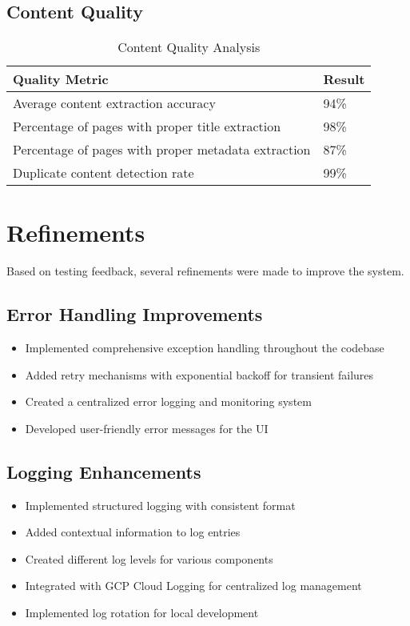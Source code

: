 \documentclass[12pt,a4paper]{report}
\begin{document}
\subsection{Content Quality}
\begin{table}[H]
    \centering
    \begin{tabularx}{\textwidth}{|X|X|}
        \hline
        \textbf{Quality Metric} & \textbf{Result} \\
        \hline
        Average content extraction accuracy & 94\% \\
        \hline
        Percentage of pages with proper title extraction & 98\% \\
        \hline
        Percentage of pages with proper metadata extraction & 87\% \\
        \hline
        Duplicate content detection rate & 99\% \\
        \hline
    \end{tabularx}
    \caption{Content Quality Analysis}
\end{table}


\section{Refinements}
Based on testing feedback, several refinements were made to improve the system.

\subsection{Error Handling Improvements}
\begin{itemize}
    \item Implemented comprehensive exception handling throughout the codebase
    \item Added retry mechanisms with exponential backoff for transient failures
    \item Created a centralized error logging and monitoring system
    \item Developed user-friendly error messages for the UI
\end{itemize}

\subsection{Logging Enhancements}
\begin{itemize}
    \item Implemented structured logging with consistent format
    \item Added contextual information to log entries
    \item Created different log levels for various components
    \item Integrated with GCP Cloud Logging for centralized log management
    \item Implemented log rotation for local development
\end{itemize}
\end{document}
